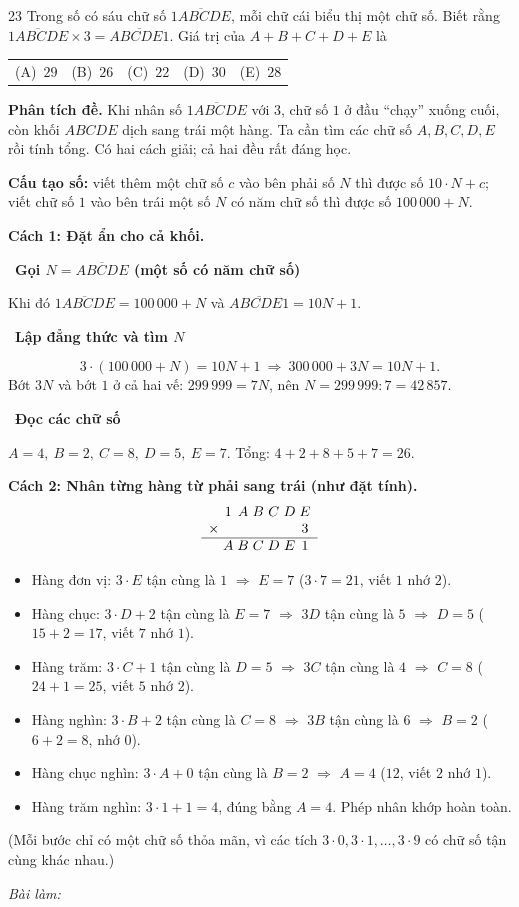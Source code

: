 \documentclass[11pt]{article}
\makeatletter
\newif\ifsol \solfalse
\newcommand{\probsol}[1]{%
  \begin{lrbox}{\solmeasure}\begin{minipage}{\dimexpr\linewidth-24pt\relax}#1\end{minipage}\end{lrbox}%
  \ifsol
    \begin{solbox}#1\end{solbox}%
  \else
    \setlength{\solht}{\dimexpr\ht\solmeasure+\dp\solmeasure+0.85cm\relax}%
    \ifdim\solht<1.35cm\setlength{\solht}{1.35cm}\fi
    \ifdim\solht>\StudentMaxWork\setlength{\solht}{\StudentMaxWork}\fi
    \begin{tcolorbox}[colback=white,colframe=Line,boxrule=0.8pt,arc=5pt,
      left=8pt,right=8pt,top=4pt,bottom=4pt,height=\solht]{\footnotesize\color{Slate}\itshape\WorkWord}\end{tcolorbox}%
  \fi}
\newcommand{\nd}[1]{\overline{#1}}
\newlength{\StudentMaxWork}\setlength{\StudentMaxWork}{7.5cm}
\newcommand{\step}[2]{\par\smallskip\noindent{\bfseries\color{tmBlue!85!black}\StepWord~#1.}\ {\bfseries #2}\par\nopagebreak}
\newcommand{\choices}[5]{\par\smallskip\noindent
  \begin{tabularx}{\linewidth}{@{}XXXXX@{}}(A)\ #1&(B)\ #2&(C)\ #3&(D)\ #4&(E)\ #5\end{tabularx}\par}
\def\WorkWord{Bài làm:}
\def\StepWord{Bước}
\makeatother
\begin{document}
\begin{probbox}{23}{\relax}
Trong số có sáu chữ số $\nd{1ABCDE}$, mỗi chữ cái biểu thị một chữ số. Biết rằng $\nd{1ABCDE}\times 3=\nd{ABCDE1}$. Giá trị của $A+B+C+D+E$ là
\choices{$29$}{$26$}{$22$}{$30$}{$28$}
\end{probbox}
\probsol{
\textbf{Phân tích đề.} Khi nhân số $\nd{1ABCDE}$ với $3$, chữ số $1$ ở đầu ``chạy'' xuống cuối, còn khối $ABCDE$ dịch sang trái một hàng. Ta cần tìm các chữ số $A,B,C,D,E$ rồi tính tổng. Có hai cách giải; cả hai đều rất đáng học.

\begin{recallbox}\textbf{Cấu tạo số:} viết thêm một chữ số $c$ vào bên phải số $N$ thì được số $10\cdot N+c$; viết chữ số $1$ vào bên trái một số $N$ có năm chữ số thì được số $100\,000+N$.\end{recallbox}

\textbf{Cách 1: Đặt ẩn cho cả khối.}
\step{1}{Gọi $N=\nd{ABCDE}$ (một số có năm chữ số)}
Khi đó $\nd{1ABCDE}=100\,000+N$ và $\nd{ABCDE1}=10N+1$.
\step{2}{Lập đẳng thức và tìm $N$}
\[3\cdot(100\,000+N)=10N+1\ \Longrightarrow\ 300\,000+3N=10N+1.\]
Bớt $3N$ và bớt $1$ ở cả hai vế: $299\,999=7N$, nên $N=299\,999:7=42\,857$.
\step{3}{Đọc các chữ số}
$A=4,\ B=2,\ C=8,\ D=5,\ E=7$. Tổng: $4+2+8+5+7=26$.

\textbf{Cách 2: Nhân từng hàng từ phải sang trái (như đặt tính).}
\[\begin{array}{r@{\;}c@{\;}c@{\;}c@{\;}c@{\;}c@{\;}c}
 & 1 & A & B & C & D & E\\
\times & & & & & & 3\\ \hline
 & A & B & C & D & E & 1
\end{array}\]
\begin{itemize}[leftmargin=1.4em,itemsep=1pt]
\item Hàng đơn vị: $3\cdot E$ tận cùng là $1$ $\Rightarrow$ $E=7$ ($3\cdot 7=21$, viết $1$ nhớ $2$).
\item Hàng chục: $3\cdot D+2$ tận cùng là $E=7$ $\Rightarrow$ $3D$ tận cùng là $5$ $\Rightarrow$ $D=5$ ($15+2=17$, viết $7$ nhớ $1$).
\item Hàng trăm: $3\cdot C+1$ tận cùng là $D=5$ $\Rightarrow$ $3C$ tận cùng là $4$ $\Rightarrow$ $C=8$ ($24+1=25$, viết $5$ nhớ $2$).
\item Hàng nghìn: $3\cdot B+2$ tận cùng là $C=8$ $\Rightarrow$ $3B$ tận cùng là $6$ $\Rightarrow$ $B=2$ ($6+2=8$, nhớ $0$).
\item Hàng chục nghìn: $3\cdot A+0$ tận cùng là $B=2$ $\Rightarrow$ $A=4$ ($12$, viết $2$ nhớ $1$).
\item Hàng trăm nghìn: $3\cdot 1+1=4$, đúng bằng $A=4$. Phép nhân khớp hoàn toàn.
\end{itemize}
(Mỗi bước chỉ có một chữ số thỏa mãn, vì các tích $3\cdot 0, 3\cdot 1,\dots,3\cdot 9$ có chữ số tận cùng khác nhau.)

}
\end{document}
